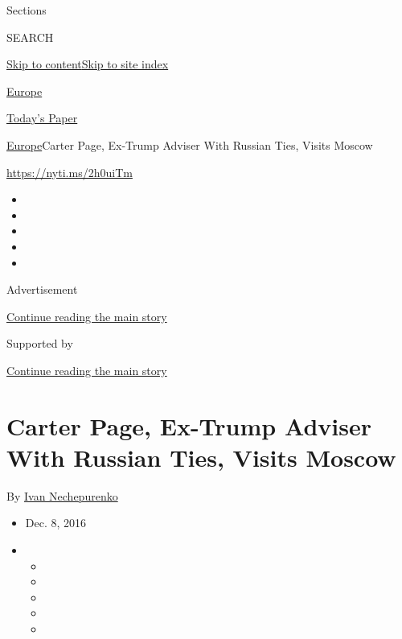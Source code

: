 Sections

SEARCH

\protect\hyperlink{site-content}{Skip to
content}\protect\hyperlink{site-index}{Skip to site index}

\href{https://www.nytimes.com/section/world/europe}{Europe}

\href{https://myaccount.nytimes.com/auth/login?response_type=cookie\&client_id=vi}{}

\href{https://www.nytimes.com/section/todayspaper}{Today's Paper}

\href{/section/world/europe}{Europe}\textbar{}Carter Page, Ex-Trump
Adviser With Russian Ties, Visits Moscow

\url{https://nyti.ms/2h0uiTm}

\begin{itemize}
\item
\item
\item
\item
\item
\end{itemize}

Advertisement

\protect\hyperlink{after-top}{Continue reading the main story}

Supported by

\protect\hyperlink{after-sponsor}{Continue reading the main story}

\hypertarget{carter-page-ex-trump-adviser-with-russian-ties-visits-moscow}{%
\section{Carter Page, Ex-Trump Adviser With Russian Ties, Visits
Moscow}\label{carter-page-ex-trump-adviser-with-russian-ties-visits-moscow}}

By \href{https://www.nytimes.com/by/ivan-nechepurenko}{Ivan
Nechepurenko}

\begin{itemize}
\item
  Dec. 8, 2016
\item
  \begin{itemize}
  \item
  \item
  \item
  \item
  \item
  \end{itemize}
\end{itemize}

